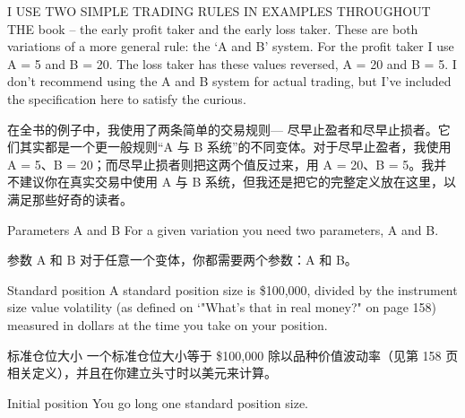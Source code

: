 

\begin{englishblock} I USE TWO SIMPLE TRADING RULES IN EXAMPLES THROUGHOUT THE book -- the early profit taker and the early loss taker. These are both variations of a more general rule: the ‘A and B' system. For the profit taker I use A = 5 and B = 20. The loss taker has these values reversed, A = 20 and B = 5. I don't recommend using the A and B system for actual trading, but I've included the specification here to satisfy the curious. \end{englishblock}

\begin{chineseblock}在全书的例子中，我使用了两条简单的交易规则--- 尽早止盈者和尽早止损者。它们其实都是一个更一般规则“A 与 B 系统”的不同变体。对于尽早止盈者，我使用 A = 5、B = 20；而尽早止损者则把这两个值反过来，用 A = 20、B = 5。我并不建议你在真实交易中使用 A 与 B 系统，但我还是把它的完整定义放在这里，以满足那些好奇的读者。\end{chineseblock}


\begin{englishblock} Parameters A and B For a given variation you need two parameters, A and B. \end{englishblock}

\begin{chineseblock}参数 A 和 B 对于任意一个变体，你都需要两个参数：A 和 B。 \end{chineseblock}

\bipairgap

\begin{englishblock} Standard position A standard position size is \$100,000, divided by the instrument size value volatility (as defined on ‘"What's that in real money?" on page 158) measured in dollars at the time you take on your position. \end{englishblock}

\begin{chineseblock}标准仓位大小 一个标准仓位大小等于 \$100,000 除以品种价值波动率（见第 158 页相关定义），并且在你建立头寸时以美元来计算。\end{chineseblock}

\bipairgap

\begin{englishblock} Initial position You go long one standard position size. \end{englishblock}


